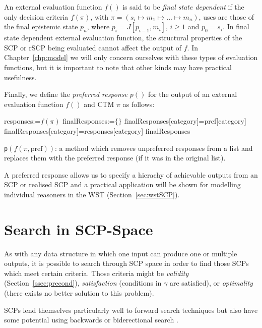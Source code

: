 An external evaluation function $f()$ is said to be \textit{final state dependent} if the only decision criteria $f(\pi)$, with $\pi=(s_i \longmapsto m_1 \longmapsto ... \longmapsto m_n )$, uses are those of the final epistemic state $p_n$, where $p_i=J[p_{i-1},m_i]$, $i\geq 1$ and $p_0=s_i$. In final state dependent external evaluation function, the structural properties of the SCP or rSCP being evaluated cannot affect the output of $f$. In Chapter~\ref{chp:model} we will only concern ourselves with these types of evaluation functions, but it is important to note that other kinds may have practical usefulness.

Finally, we define the \textit{preferred response} $p()$ for the output of an external evaluation function $f()$ and CTM $\pi$ as follows:

\begin{algorithm}[H] 
\SetAlgoLined
{}
{
responses:=$f(\pi)$\;
finalResponses:=$\{\}$
{
{
finalResponses[category]=pref[category]
}
\Else
{
finalResponses[category]=responses[category]
}
\Return finalResponses
}

}
\caption{\texttt{p}$(f(\pi,\text{pref}))$: a method which removes unpreferred responses from a list and replaces them with the preferred response (if it was in the original list).}
\label{alg:unpref}
\end{algorithm}

A preferred response allows us to specify a hierachy of achievable outputs from an SCP or realised SCP and a practical application will be shown for modelling individual reasoners in the WST (Section~\ref{sec:wstSCP}).

\section{Search in SCP-Space}\label{ssec:scpSearch}
As with any data structure in which one input can produce one or multiple outputs, it is possible to search through SCP space in order to find those SCPs which meet certain criteria. Those criteria might be \textit{validity} (Section~\ref{ssec:precond}), \textit{satisfaction} (conditions in $\gamma$ are satisfied), or \textit{optimality} (there exists no better solution to this problem).

SCPs lend themselves particularly well to forward search techniques \citep{korf1996artificial}  but also have some potential using backwards or biderectional search \citep{de1983bidirectional}. 

